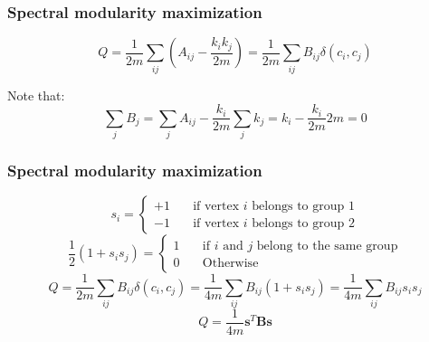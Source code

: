 \documentclass{beamer}
\begin{document}
\begin{frame}
    \frametitle{Spectral modularity maximization}
    \centering
    $$Q = \frac{1}{2m}\sum\limits_{ij}\left(A_{ij}-\frac{k_ik_j}{2m}\right) = \frac{1}{2m}\sum\limits_{ij}B_{ij}\delta(c_i,c_j)$$

    \vspace{2em}
    \justifying
    Note that:
    $$\sum\limits_{j}B_{j} = \sum\limits_jA_{ij}-\frac{k_i}{2m}\sum\limits_{j}k_j = k_i-\frac{k_i}{2m}2m = 0$$
\end{frame}
\begin{frame}
    \frametitle{Spectral modularity maximization}
    \centering
$$s_i = \begin{cases}+1&\quad \text{if vertex $i$ belongs to group $1$}\\-1 &\quad \text{if vertex $i$ belongs to group $2$}\end{cases}$$
\pause
    \vspace{1em}
$$\frac{1}{2}(1+s_is_j) = \begin{cases}1&\quad\text{if $i$ and $j$ belong to the same group}\\0&\quad\text{Otherwise}\end{cases}$$
\pause
    \vspace{1em}
$$Q = \frac{1}{2m}\sum\limits_{ij}B_{ij}\delta(c_i,c_j) = \frac{1}{4m}\sum\limits_{ij}B_{ij}(1 + s_is_j) = \frac{1}{4m}\sum\limits_{ij}B_{ij}s_is_j$$
    \vspace{1em}
$$Q = \frac{1}{4m}{\mathbf s}^T{\mathbf B}{\mathbf s}$$
\end{frame}
\end{document}
